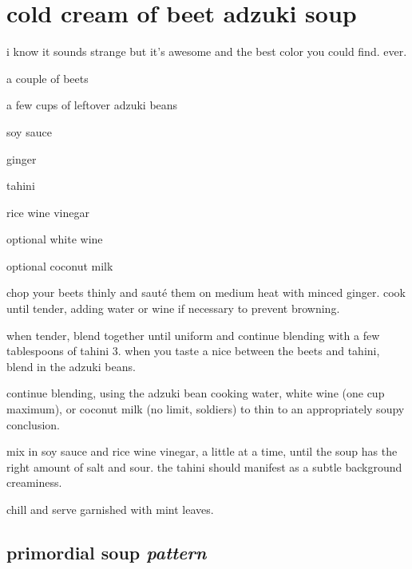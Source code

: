 \section{cold cream of beet adzuki soup}

i know it sounds strange but it's awesome and the best color you could
find. ever.

\begin{ingredients}
  \item a couple of beets
  \item a few cups of leftover adzuki beans
  \item soy sauce
  \item ginger
  \item tahini
  \item rice wine vinegar\\

  \item optional white wine
  \item optional coconut milk
\end{ingredients}

\begin{algorithm}
  \item chop your beets thinly and saut\'{e} them on medium heat with
  minced ginger. cook until tender, adding water or wine if necessary
  to prevent browning.

  \item when tender, blend together until uniform and continue
  blending with a few tablespoons of tahini 3. when you taste a nice
   between the beets and tahini, blend in the adzuki beans.

  \item continue blending, using the adzuki bean cooking water, white
  wine (one cup maximum), or coconut milk (no limit, soldiers) to thin
  to an appropriately soupy conclusion.

  \item mix in soy sauce and rice wine vinegar, a little at a time,
  until the soup has the right amount of salt and sour. the tahini
  should manifest as a subtle background creaminess.

  \item chill and serve garnished with mint leaves.
\end{algorithm}

\subsection{primordial soup \textit{pattern}}

